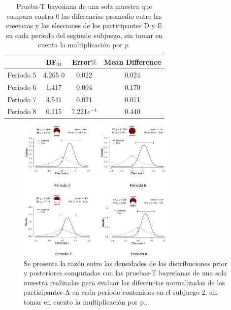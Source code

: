 \begin{table}
\caption[Diferencias Normalizadas en el Subjuego 2, omitiendo la multiplicación $\cdot p$ (Participantes D y E)]{Prueba-T bayesiana de una sola muestra que compara contra 0 las diferencias promedio entre las creencias y las elecciones de los participantes D y E en cada periodo del segundo subjuego, sin tomar en cuenta la multiplicación por $p$.}
\label{DN_Sub2_DE_NoP}
\centering
\begin{tabular}{l | c c c}  %
\toprule
\textbf{} & \textbf{BF$_{01}$} & \textbf{Error$\%$} & \textbf{Mean Difference}\\
\midrule
Periodo 5 & 4.265 0& 0.022 & 0.024 \\
Periodo 6 & 1.417 & 0.004 & 0.170 \\
Periodo 7 & 3.541 & 0.021 & 0.071 \\
Periodo 8 & 0.115 & 7.221$e^{-4}$ & 0.440 \\
\bottomrule
\end{tabular}
\end{table}

\begin{figure}[th]
\centering
\includegraphics[width=0.70\textwidth]{Figures/Fig_11} 
\caption[Cambio en el número elegido periodo a periodo.]{Se presenta la razón entre las densidades de las distribuciones prior y posteriores  computadas con las pruebas-T bayesianas de una sola muestra realizadas para evaluar las diferencias normalizadas de los participantes A en cada periodo contenidos en el subjuego 2, sin tomar en cuento la multiplicación por p..}
\label{fig:DiferenciasNormalizadas_Subjuego2_A_NoP}
\end{figure}

